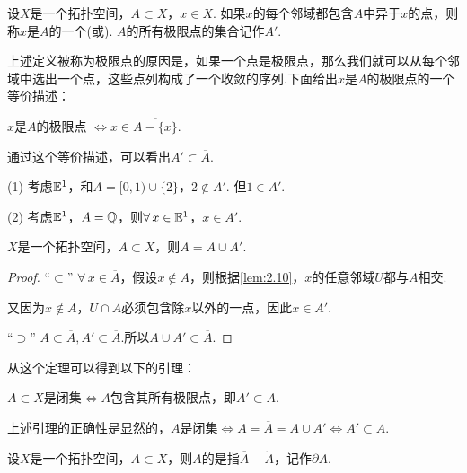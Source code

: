\begin{definition}[极限点][def:2.13]
    设$X$是一个拓扑空间，$A\subset X$，$x\in X$. 如果$x$的每个邻域都包含$A$中异于$x$的点，则称$x$是$A$的一个(或). $A$的所有极限点的集合记作$A'$.
\end{definition}
上述定义被称为极限点的原因是，如果一个点是极限点，那么我们就可以从每个邻域中选出一个点，这些点列构成了一个收敛的序列.下面给出$x$是$A$的极限点的一个等价描述：
\begin{note}
    $x$是$A$的极限点 $\Leftrightarrow x\in\overline{A-\{x\}}$.
\end{note}
通过这个等价描述，可以看出$A'\subset\overline{A}$.\par

\begin{instance}
    (1)\; 考虑$\mathbb{E}^1$，和$A=[0,1)\cup\{2\}$，$2\notin A'$. 但$1\in A'$.\par
    (2)\; 考虑$\mathbb{E}^1$，$A=\mathbb{Q}$，则$\forall\, x\in\mathbb{E}^1$，$x\in A'$.
\end{instance}

\begin{proposition}[][prop:2.10]
    $X$是一个拓扑空间，$A\subset X$，则$\overline{A}=A\cup A'$.
\end{proposition}
\begin{proof}
    “$\subset$” $\forall\,x\in\overline{A}$，假设$x\notin A$，则根据\cref{lem:2.10}，$x$的任意邻域$U$都与$A$相交.\par
    又因为$x\notin A$，$U\cap A$必须包含除$x$以外的一点，因此$x\in A'$.\par
    “$\supset$” $A\subset\overline{A},A'\subset\overline{A}$.所以$A\cup A'\subset\overline{A}$.
\end{proof}

从这个定理可以得到以下的引理：

\begin{corollary}[][cor:2.1]
    $A\subset X$是闭集$\Leftrightarrow A$包含其所有极限点，即$A'\subset A$.
\end{corollary}
上述引理的正确性是显然的，$A$是闭集$\Leftrightarrow A=\overline{A}=A\cup A'\Leftrightarrow A'\subset A$.\par

\begin{definition}[边界][def:2.14]
    设$X$是一个拓扑空间，$A\subset X$，则$A$的是指$\overline{A}-\mathring{A}$，记作$\partial A$.
\end{definition}

